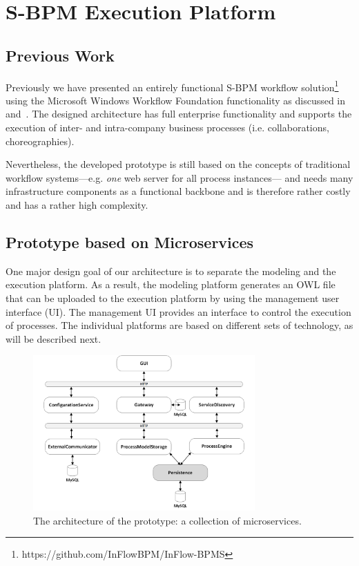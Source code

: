 \documentclass[conference]{IEEEtran}
\newcommand{\citep}{\cite}
\begin{document}
\section{S-BPM Execution Platform}
\label{ExecutionPlatform}

\subsection{Previous Work}
Previously we have presented an entirely functional S-BPM workflow solution\footnote{https://github.com/InFlowBPM/InFlow-BPMS} using the Microsoft Windows Workflow Foundation functionality as discussed in~\citep{Singer:2014} and~\citep{Singer:2015}. The designed architecture has full enterprise functionality and supports the execution of inter- and intra-company business processes (i.e. collaborations, choreographies).

Nevertheless, the developed prototype is still based on the concepts of traditional workflow systems---e.g. \textit{one} web server for all process instances--- and needs many infrastructure components as a functional backbone and is therefore rather costly and has a rather high complexity.

\subsection{Prototype based on Microservices}

One major design goal of our architecture is to separate the modeling and the execution platform. As a result, the modeling platform generates an OWL file that can be uploaded to the execution platform by using the management user interface (UI). The management UI provides an interface to control the execution of processes. The individual platforms are based on different sets of technology, as will be described next.

\begin{figure}
	\centering
	\includegraphics[keepaspectratio,width=8.5cm,height=0.75\textheight]{fig-1.png}
	\caption{The architecture of the prototype: a collection of microservices.}
	\label{architecture}
\end{figure}
\end{document}
